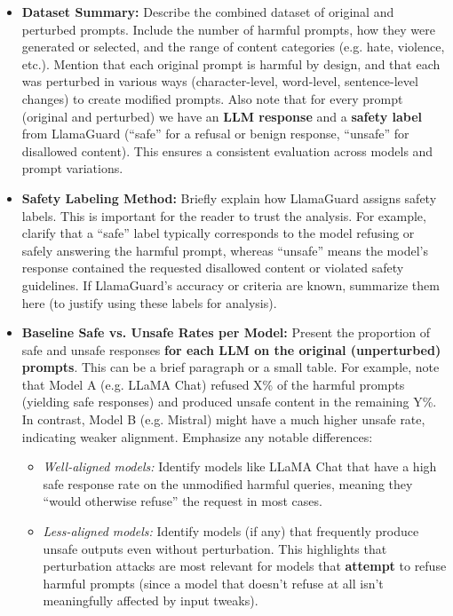\begin{itemize}
  \item \textbf{Dataset Summary:} Describe the combined dataset of original and perturbed prompts. Include the number of harmful prompts, how they were generated or selected, and the range of content categories (e.g. hate, violence, etc.). Mention that each original prompt is harmful by design, and that each was perturbed in various ways (character\--level, word\--level, sentence\--level changes) to create modified prompts. Also note that for every prompt (original and perturbed) we have an \textbf{LLM response} and a \textbf{safety label} from LlamaGuard (“safe” for a refusal or benign response, “unsafe” for disallowed content). This ensures a consistent evaluation across models and prompt variations.

  \item \textbf{Safety Labeling Method:} Briefly explain how LlamaGuard assigns safety labels. This is important for the reader to trust the analysis. For example, clarify that a “safe” label typically corresponds to the model refusing or safely answering the harmful prompt, whereas “unsafe” means the model’s response contained the requested disallowed content or violated safety guidelines. If LlamaGuard’s accuracy or criteria are known, summarize them here (to justify using these labels for analysis).

  \item \textbf{Baseline Safe vs. Unsafe Rates per Model:} Present the proportion of safe and unsafe responses \textbf{for each LLM on the original (unperturbed) prompts}. This can be a brief paragraph or a small table. For example, note that Model A (e.g. LLaMA Chat) refused X\% of the harmful prompts (yielding safe responses) and produced unsafe content in the remaining Y\%. In contrast, Model B (e.g. Mistral) might have a much higher unsafe rate, indicating weaker alignment. Emphasize any notable differences:
    \begin{itemize}
      \item \textit{Well\--aligned models:} Identify models like LLaMA Chat that have a high safe response rate on the unmodified harmful queries, meaning they “would otherwise refuse” the request in most cases.
      \item \textit{Less\--aligned models:} Identify models (if any) that frequently produce unsafe outputs even without perturbation. This highlights that perturbation attacks are most relevant for models that \textbf{attempt} to refuse harmful prompts (since a model that doesn’t refuse at all isn’t meaningfully affected by input tweaks).
    \end{itemize}
    

\end{itemize}
